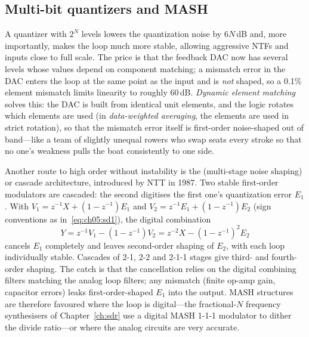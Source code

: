
\subsection{Multi-bit quantizers and MASH}

A quantizer with $2^N$ levels lowers the quantization noise by $6N$\,dB and, more importantly,
makes the loop much more stable, allowing aggressive NTFs and inputs close to full scale. The
price is that the feedback DAC now has several levels whose values depend on component matching;
a mismatch error in the DAC enters the loop at the same point as the input and is \emph{not}
shaped, so a 0.1\% element mismatch limits linearity to roughly 60\,dB. \emph{Dynamic element
matching} solves this: the DAC is built from identical unit elements, and the logic rotates
which elements are used (in \emph{data-weighted averaging}, the elements are used in strict
rotation), so that the mismatch error itself is first-order noise-shaped out of band---like a
team of slightly unequal rowers who swap seats every stroke so that no one's weakness pulls the
boat consistently to one side.

Another route to high order without instability is the  (multi-stage noise shaping)
or cascade architecture, introduced by NTT in 1987. Two stable first-order modulators are
cascaded: the second digitises the first one's quantization error $E_1$. With
$V_1=z^{-1}X+(1-z^{-1})E_1$ and $V_2=z^{-1}E_1+(1-z^{-1})E_2$ (sign conventions as in~\eqref{eq:ch05:sd1}), the digital
combination
\begin{equation}
Y=z^{-1}V_1-(1-z^{-1})V_2=z^{-2}X-(1-z^{-1})^2E_2
\end{equation}
cancels $E_1$ completely and leaves second-order shaping of $E_2$, with each loop individually
stable. Cascades of 2-1, 2-2 and 2-1-1 stages give third- and fourth-order shaping. The catch is
that the cancellation relies on the digital combining filters matching the analog loop filters;
any mismatch (finite op-amp gain, capacitor errors) leaks first-order-shaped $E_1$ into the
output. MASH structures are therefore favoured where the loop is digital---the fractional-$N$
frequency synthesisers of Chapter~\ref{ch:sdr} use a digital MASH 1-1-1 modulator to dither the
divide ratio---or where the analog circuits are very accurate.



